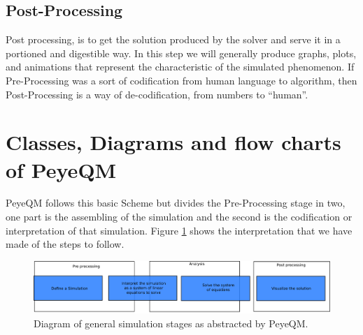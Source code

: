\subsection{Post-Processing}
Post processing, is to get the solution produced by the solver and serve it in a portioned and digestible way. In this step we will generally produce graphs, plots, and animations that represent the characteristic of the simulated phenomenon. If Pre-Processing was a sort of codification from human language to algorithm, then Post-Processing is a way of de-codification, from numbers to ``human''.

\section{Classes, Diagrams and flow charts of PeyeQM}
PeyeQM follows this basic Scheme but divides the Pre-Processing stage in two, one part is the assembling of the simulation and the second is the codification or interpretation of that simulation. Figure \ref{fig:stages_2} shows the interpretation that we have made of the  steps to follow.
\begin{figure}[h]
\centering
\includegraphics[scale=0.3]{./img/stages_abstract.pdf}
\caption{Diagram of general simulation stages as abstracted by PeyeQM.}
\label{fig:stages_2}
\end{figure}

